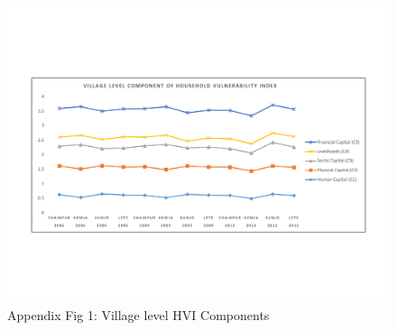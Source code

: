 \begin{landscape}
	\begin{figure}[h] 
		\vspace{-100pt}
		\includegraphics[scale=0.8]{HVI_Component_Village_Panel.pdf}
		\vspace{-50pt}
		\caption*{Appendix Fig 1: Village level HVI Components} 
		\label{fig:VDClevelhvicomponents}
		\captionsetup{skip=20pt}
	\end{figure}
\end{landscape}

